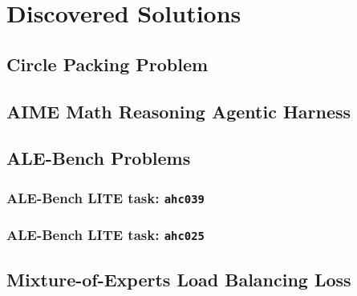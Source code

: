 \clearpage

\section{\ouralgo Discovered Solutions}
\label{appsec:discovered_solutions}
\subsection{Circle Packing Problem}
\label{appsec:circle_packing}



\clearpage
\subsection{AIME Math Reasoning Agentic Harness}

\label{appsec:aime_agent}



\clearpage
\subsection{ALE-Bench Problems}

\subsubsection{ALE-Bench LITE task: \texttt{ahc039}}



\clearpage
\subsubsection{ALE-Bench LITE task: \texttt{ahc025}}



\clearpage
\subsection{Mixture-of-Experts Load Balancing Loss}

